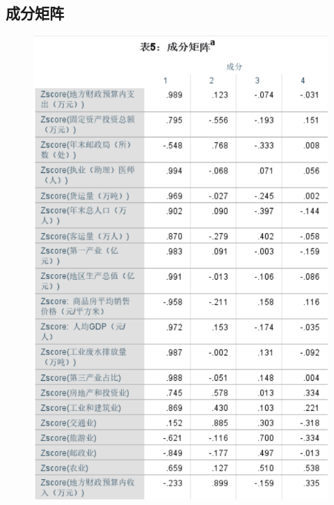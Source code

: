 \documentclass{whutmod}
\begin{document}
\subsection{成分矩阵}
	\begin{figure}[H]
	\centering
	\includegraphics[width=\textwidth]{figures/1.png}

\end{figure}  
\end{document}
